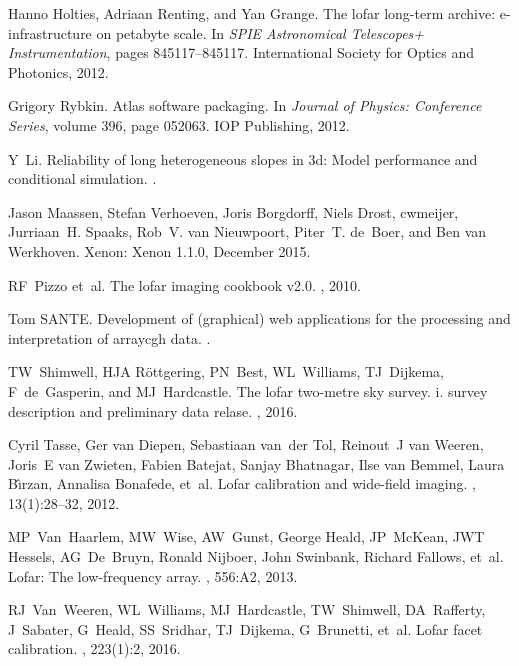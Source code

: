 \begin{thebibliography}{99}
Hanno Holties, Adriaan Renting, and Yan Grange.
\newblock The lofar long-term archive: e-infrastructure on petabyte scale.
\newblock In {\em SPIE Astronomical Telescopes+ Instrumentation}, pages
  845117--845117. International Society for Optics and Photonics, 2012.

Grigory Rybkin.
\newblock Atlas software packaging.
\newblock In {\em Journal of Physics: Conference Series}, volume 396, page
  052063. IOP Publishing, 2012.

Y~Li.
\newblock Reliability of long heterogeneous slopes in 3d: Model performance and
  conditional simulation.
.

Jason Maassen, Stefan Verhoeven, Joris Borgdorff, Niels Drost, cwmeijer,
  Jurriaan~H. Spaaks, Rob~V. van Nieuwpoort, Piter~T. de~Boer, and Ben van
  Werkhoven.
\newblock Xenon: Xenon 1.1.0, December 2015.

RF~Pizzo et~al.
\newblock The lofar imaging cookbook v2.0.
, 2010.

Tom SANTE.
\newblock Development of (graphical) web applications for the processing and
  interpretation of arraycgh data.
.

TW~Shimwell, HJA R{\"o}ttgering, PN~Best, WL~Williams, TJ~Dijkema,
  F~de~Gasperin, and MJ~Hardcastle.
\newblock The lofar two-metre sky survey. i. survey description and preliminary
  data relase.
, 2016.

Cyril Tasse, Ger van Diepen, Sebastiaan van~der Tol, Reinout~J van Weeren,
  Joris~E van Zwieten, Fabien Batejat, Sanjay Bhatnagar, Ilse van Bemmel, Laura
  B{\^\i}rzan, Annalisa Bonafede, et~al.
\newblock Lofar calibration and wide-field imaging.
, 13(1):28--32, 2012.

MP~Van~Haarlem, MW~Wise, AW~Gunst, George Heald, JP~McKean, JWT Hessels,
  AG~De~Bruyn, Ronald Nijboer, John Swinbank, Richard Fallows, et~al.
\newblock Lofar: The low-frequency array.
, 556:A2, 2013.

RJ~Van~Weeren, WL~Williams, MJ~Hardcastle, TW~Shimwell, DA~Rafferty, J~Sabater,
  G~Heald, SS~Sridhar, TJ~Dijkema, G~Brunetti, et~al.
\newblock Lofar facet calibration.
, 223(1):2, 2016.


\end{thebibliography}
